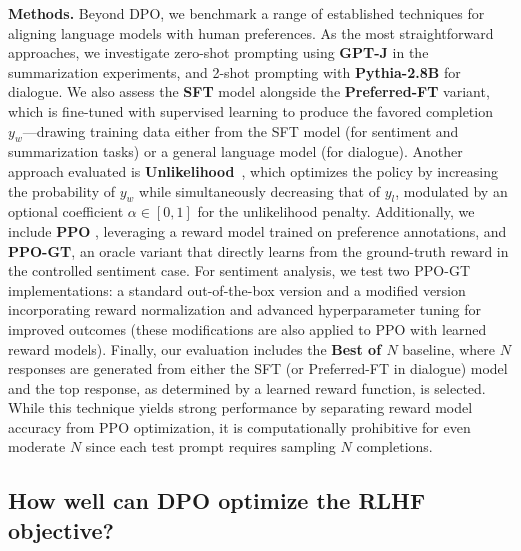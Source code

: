 \textbf{Methods.} Beyond DPO, we benchmark a range of established techniques for aligning language models with human preferences. As the most straightforward approaches, we investigate zero-shot prompting using \textbf{GPT-J} \citep{gpt-j} in the summarization experiments, and 2-shot prompting with \textbf{Pythia-2.8B} \citep{biderman2023pythia} for dialogue. We also assess the \textbf{SFT} model alongside the \textbf{Preferred-FT} variant, which is fine-tuned with supervised learning to produce the favored completion $y_w$—drawing training data either from the SFT model (for sentiment and summarization tasks) or a general language model (for dialogue). Another approach evaluated is \textbf{Unlikelihood}~\citep{welleck2019neural}, which optimizes the policy by increasing the probability of $y_w$ while simultaneously decreasing that of $y_l$, modulated by an optional coefficient $\alpha\in[0,1]$ for the unlikelihood penalty. Additionally, we include \textbf{PPO} \citep{schulman2017proximal}, leveraging a reward model trained on preference annotations, and \textbf{PPO-GT}, an oracle variant that directly learns from the ground-truth reward in the controlled sentiment case. For sentiment analysis, we test two PPO-GT implementations: a standard out-of-the-box version \cite{leandro_von_werra_2023_7790115} and a modified version incorporating reward normalization and advanced hyperparameter tuning for improved outcomes (these modifications are also applied to PPO with learned reward models). Finally, our evaluation includes the \textbf{Best of $N$} baseline, where $N$ responses are generated from either the SFT (or Preferred-FT in dialogue) model and the top response, as determined by a learned reward function, is selected. While this technique yields strong performance by separating reward model accuracy from PPO optimization, it is computationally prohibitive for even moderate $N$ since each test prompt requires sampling $N$ completions.

\subsection{How well can DPO optimize the RLHF objective?}

